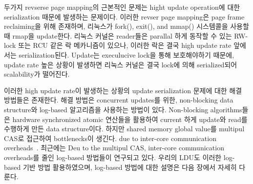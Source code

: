 \fi


\ifkor
두가지 revserse page mapping의 근본적인 문제는 hight update operation에 대한 serialization 때문에
발생하는 문제이다.
이러한 revser page mapping은 page frame reclaiming을 위해 존재하며, 리눅스가 fork(), exit(),
and mmap() 시스템콜을 사용할 때 rmap을 update한다.
리눅스 커널은 reader들은 parallal 하게 동작할 수 있는 RW-lock 또는 RCU 같은 락 메카니즘이 있으나, 이러한 락은 결국
high update rate 앞에서는 serialization된다.
Update는 execulucive lock을 통해 보호해야하기 때문에, update rate 높은 상황이 발생하면 리눅스
커널은 결국 lock에 의해 serialized되어 scalability가 떨어진다.
\else

\fi


\ifkor
이러한 high update rate이 발생하는 상황의 update serialization 문제에 대한 해결 방법들은 존재한다. 
해결 방법은 concurrent updates를 위한, non-blocking data structure와
log-based 알고리즘을 사용하는 방법이 있다.
Non-blocking algorithms들은 hardware synchronized atomic 연산들을 활용하여 current 하게
update와 read를 수행하게 만든 data structure이다.
하지만 shared memory global value를 multipul CAS로 접근하여 bottlenecks이 생긴다.
due to inter-core communication overheads~\cite{SilasBoydWickizerPth}.
최근에는 Deu to the multipul CAS, inter-core communication overheads를 줄인 log-based
방법들이 연구되고 있다.
우리의 LDU도 이러한 log-based 기반 방법 활용하였으며, log-based 방법에 대한 설명은 다음 장에서 자세히 다룬다.
\else


\fi












